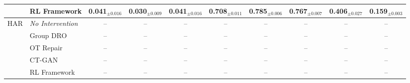 \begin{table}[t]
\begin{tabular}{llcccccccc}
 & RL Framework & 0.041$_{\pm 0.016}$ & 0.030$_{\pm 0.009}$ & 0.041$_{\pm 0.016}$ & 0.708$_{\pm 0.011}$ & 0.785$_{\pm 0.006}$ & 0.767$_{\pm 0.007}$ & 0.406$_{\pm 0.027}$ & 0.159$_{\pm 0.003}$ \\
\midrule
\multirow{5}{*}{HAR} & \textit{No Intervention} & -- & -- & -- & -- & -- & -- & -- & -- \\
 & Group DRO & -- & -- & -- & -- & -- & -- & -- & -- \\
 & OT Repair & -- & -- & -- & -- & -- & -- & -- & -- \\
 & CT-GAN & -- & -- & -- & -- & -- & -- & -- & -- \\
 & RL Framework & -- & -- & -- & -- & -- & -- & -- & -- \\
\bottomrule
\end{tabular}
\end{table}

